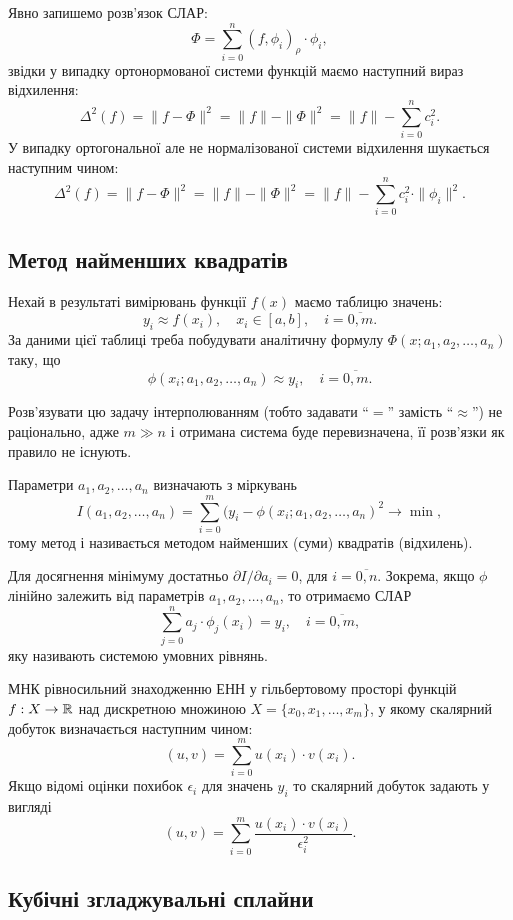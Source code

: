 
Явно запишемо розв'язок СЛАР: \[ \Phi = \sum_{i = 0}^n (f, \phi_i)_\rho \cdot \phi_i, \] звідки у випадку ортонормованої системи функцій маємо наступний вираз відхилення: \[ \Delta^2(f) = \|f - \Phi\|^2 = \|f\| - \|\Phi\|^2 = \|f\| - \sum_{i=0}^n c_i^2.\] У випадку ортогональної але не нормалізованої системи відхилення шукається наступним чином: \begin{equation} \label{delta} \Delta^2(f) = \|f - \Phi\|^2 = \|f\| - \|\Phi\|^2 = \|f\| - \sum_{i=0}^n c_i^2 \cdot \|\phi_i\|^2. \end{equation}

\subsection{Метод найменших квадратів}

Нехай в результаті вимірювань функції $f(x)$ маємо таблицю значень: \[ y_i \approx f(x_i), \quad x_i \in [a, b], \quad i = \overline{0, m}.\] За даними цієї таблиці треба побудувати аналітичну формулу $\Phi(x; a_1, a_2, \ldots, a_n)$ таку, що \[ \phi(x_i; a_1, a_2, \ldots, a_n) \approx y_i, \quad i = \overline{0, m}.\] 

Розв'язувати цю задачу інтерполюванням (тобто задавати ``$=$'' замість ``$\approx$'') не раціонально, адже $m \gg n$ і отримана система буде перевизначена, її розв'язки як правило не існують. \medskip

Параметри $a_1, a_2, \ldots, a_n$ визначають з міркувань \[I(a_1, a_2, \ldots, a_n) = \sum_{i = 0}^m (y_i - \phi(x_i; a_1, a_2, \ldots, a_n)^2 \to \min,\] тому метод і називається методом найменших (суми) квадратів (відхилень). \medskip

Для досягнення мінімуму достатньо $\partial I / \partial a_i = 0$, для $i = \overline{0, n}$. Зокрема, якщо $\phi$ лінійно залежить від параметрів $a_1, a_2, \ldots, a_n$, то отримаємо СЛАР \[ \sum_{j = 0}^n a_j \cdot \phi_j(x_i) = y_i, \quad i = \overline{0, m},\] яку називають системою умовних рівнянь. \medskip

МНК рівносильний знаходженню ЕНН у гільбертовому просторі функцій $f: X \to \mathbb{R}$ над дискретною множиною $X = \{x_0, x_1, \ldots, x_m\}$, у якому скалярний добуток визначається наступним чином: \[ (u, v) = \sum_{i = 0}^m u(x_i) \cdot v(x_i). \] Якщо відомі оцінки похибок $\epsilon_i$ для значень $y_i$ то скалярний добуток задають у вигляді \[ (u, v) = \sum_{i = 0}^m \frac{u(x_i) \cdot v(x_i)}{\epsilon_i^2}. \]

\subsection{Кубічні згладжувальні сплайни}


